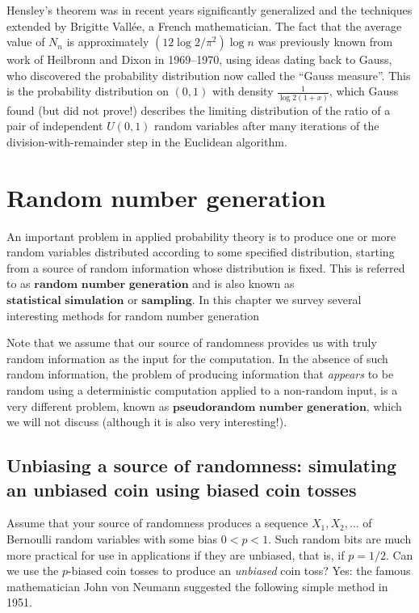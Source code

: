 \documentclass[11pt]{report}
\theoremstyle{plain}
\theoremstyle{definition}
\begin{document}
Hensley's theorem was in recent years significantly
generalized and the techniques extended by Brigitte
Vallée, a French mathematician. The fact that the
average value of $N_n$ is approximately
$(12\log 2/\pi^2)\log n$ was previously known from
work of Heilbronn and Dixon in 1969--1970, using ideas
dating back to Gauss, who discovered the probability
distribution now called the ``Gauss measure''. This is
the probability distribution on $(0,1)$ with density
$\frac{1}{\log 2(1+x)}$, which Gauss found (but did
not prove!) describes the limiting distribution of the
ratio of a pair of independent $U(0,1)$ random
variables after many iterations of the
division-with-remainder step in the Euclidean
algorithm.

\chapter{Random number generation}
An important problem in applied probability theory is
to produce one or more random variables distributed
according to some specified distribution, starting
from a source of random information whose distribution
is fixed. This is referred to as
$\textbf{random number generation}$ and is also known
as $\textbf{statistical simulation}$ or
$\textbf{sampling}$. In this chapter we survey
several interesting methods for random number
generation

Note that we assume that our source of randomness
provides us with truly random information as the input
for the computation. In the absence of such random
information, the problem of producing information that
\emph{appears} to be random using a deterministic
computation applied to a non-random input, is a very
different problem, known as
$\textbf{pseudorandom number generation}$, which we
will not discuss (although it is also very
interesting!).

\section{Unbiasing a source of randomness: simulating an unbiased coin using biased coin tosses}
Assume that your source of randomness produces a
sequence $X_1, X_2, \ldots$ of Bernoulli random
variables with some bias $0<p<1$. Such random bits
are much more practical for use in applications if
they are unbiased, that is, if $p=1/2$. Can we use
the $p$-biased coin tosses to produce an \emph{unbiased}
coin toss? Yes: the famous mathematician John von
Neumann suggested the following simple method in 1951.
\end{document}
